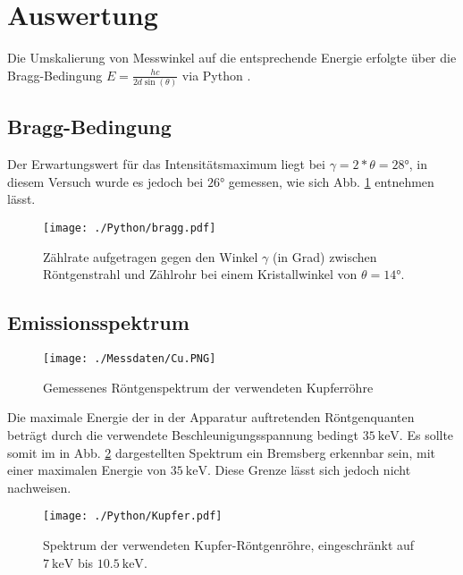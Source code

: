 \section{Auswertung}
\label{sec:Auswertung}
Die Umskalierung von Messwinkel auf die entsprechende Energie erfolgte über die Bragg-Bedingung $E = \frac{hc}{2d\sin(\theta)}$ via Python \cite{matplotlib} \cite{numpy} \cite{uncertainties}.

\subsection{Bragg-Bedingung}
\label{sec:bragg}

Der Erwartungswert für das Intensitätsmaximum liegt bei $\gamma = 2*\theta = 28\si{\degree} $, in diesem Versuch wurde es jedoch bei $26\si{\degree}$ gemessen, wie sich Abb. \ref{fig:bragg} entnehmen lässt.

\begin{figure}
  \centering
  \texttt{[image: ./Python/bragg.pdf]}
  \caption{Zählrate aufgetragen gegen den Winkel $\gamma$ (in Grad) zwischen Röntgenstrahl und Zählrohr bei einem Kristallwinkel von $\theta = 14 \si{\degree}$.}
  \label{fig:bragg}
\end{figure}

\subsection{Emissionsspektrum}
\label{sec:emission}

\begin{figure}
  \centering
  \texttt{[image: ./Messdaten/Cu.PNG]}
  \caption{Gemessenes Röntgenspektrum der verwendeten Kupferröhre}
  \label{fig:brems}
\end{figure}

Die maximale Energie der in der Apparatur auftretenden Röntgenquanten beträgt durch die verwendete Beschleunigungsspannung bedingt $\SI{35}{\kilo \eV}$. Es sollte somit im in Abb. \ref{fig:brems} dargestellten Spektrum ein Bremsberg erkennbar sein, mit einer maximalen Energie von $\SI{35}{\kilo \eV}$. Diese Grenze lässt sich jedoch nicht nachweisen.

\begin{figure}
  \centering
  \texttt{[image: ./Python/Kupfer.pdf]}
  \caption{Spektrum der verwendeten Kupfer-Röntgenröhre, eingeschränkt auf $\SI{7}{\kilo \eV}$ bis $\SI{10.5}{\kilo \eV}$.}
  \label{fig:klinie}
\end{figure}

